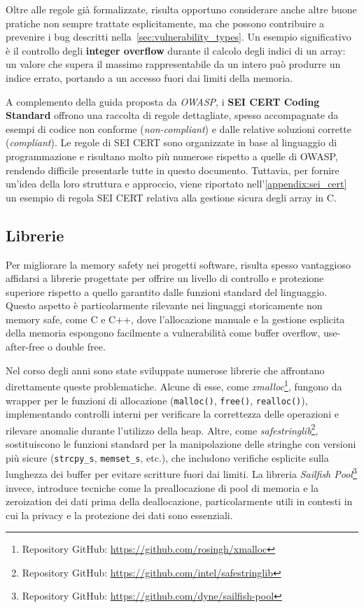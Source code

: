 Oltre alle regole già formalizzate, risulta opportuno considerare anche altre buone
pratiche non sempre trattate esplicitamente, ma che possono contribuire a
prevenire i bug descritti nella~\autoref{sec:vulnerability_types}. Un esempio significativo
è il controllo degli \textbf{integer overflow} durante il calcolo degli indici
di un array: un valore che supera il massimo rappresentabile da un intero può produrre
un indice errato, portando a un accesso fuori dai limiti della memoria.

A complemento della guida proposta da \textit{OWASP}, i \textbf{SEI CERT Coding
Standard}\cite{cert_coding_standard} offrono una raccolta di regole dettagliate,
spesso accompagnate da esempi di codice non conforme (\textit{non-compliant}) e
dalle relative soluzioni corrette (\textit{compliant}). Le regole di SEI CERT
sono organizzate in base al linguaggio di programmazione e risultano molto più
numerose rispetto a quelle di OWASP, rendendo difficile presentarle tutte in questo
documento. Tuttavia, per fornire un'idea della loro struttura e approccio, viene
riportato nell'\autoref{appendix:sei_cert} un esempio di regola SEI CERT
relativa alla gestione sicura degli array in C.

\subsection{Librerie}
\label{sec:librerie}

Per migliorare la memory safety nei progetti software, risulta spesso
vantaggioso affidarsi a librerie progettate per offrire un livello di controllo
e protezione superiore rispetto a quello garantito dalle funzioni standard del
linguaggio. Questo aspetto è particolarmente rilevante nei linguaggi storicamente
non memory safe, come C e C++, dove l'allocazione manuale e la gestione esplicita
della memoria espongono facilmente a vulnerabilità come buffer overflow, use-after-free
o double free.

Nel corso degli anni sono state sviluppate numerose librerie che affrontano
direttamente queste problematiche. Alcune di esse, come \textit{xmalloc}\footnote{Repository
GitHub: \url{https://github.com/rosingh/xmalloc}}, fungono da wrapper per le funzioni
di allocazione (\texttt{malloc()}, \texttt{free()}, \texttt{realloc()}), implementando
controlli interni per verificare la correttezza delle operazioni e rilevare anomalie
durante l'utilizzo della heap. Altre, come \textit{safestringlib}\footnote{Repository
GitHub: \url{https://github.com/intel/safestringlib}}, sostituiscono le funzioni
standard per la manipolazione delle stringhe con versioni più sicure (\texttt{strcpy\_s},
\texttt{memset\_s}, etc.), che includono verifiche esplicite sulla lunghezza dei
buffer per evitare scritture fuori dai limiti. La libreria \textit{Sailfish Pool}\footnote{Repository
GitHub: \url{https://github.com/dyne/sailfish-pool}} invece, introduce tecniche
come la preallocazione di pool di memoria e la zeroization dei dati prima della
deallocazione, particolarmente utili in contesti in cui la privacy e la protezione
dei dati sono essenziali.

